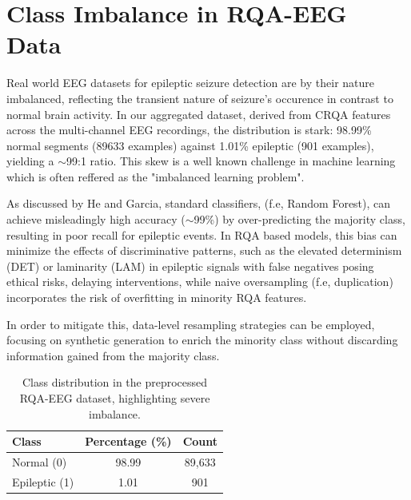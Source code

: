 \documentclass{article}
\begin{document}

				\section{Class Imbalance in RQA-EEG Data}

				Real world EEG datasets for epileptic seizure detection are by their nature imbalanced, 
				reflecting the transient nature of seizure's occurence in contrast to normal brain activity. 
				In our aggregated dataset, derived from CRQA features across the multi-channel EEG recordings,
				the distribution is stark: 98.99\% normal segments (89633 examples) against 1.01\% epileptic (901 examples), 
				yielding a $\sim$99:1 ratio. This skew is a well known challenge in machine 
				learning which is often reffered as the "imbalanced learning problem".

				As discussed by He and Garcia\cite{he2009}, standard classifiers, (f.e, Random Forest), 
				can achieve misleadingly high accuracy ($\sim$99\%) 
				by over-predicting the majority class, resulting in poor recall for epileptic events.
				In RQA based models, this bias can minimize the effects of discriminative patterns, 
				such as the elevated determinism (DET) or laminarity (LAM) in epileptic signals with 
				false negatives posing ethical risks, delaying interventions, while naive oversampling 
				(f.e, duplication) incorporates the risk of overfitting in minority RQA features.

				In order to mitigate this, data-level resampling strategies can be employed, focusing on 
				synthetic generation to enrich the minority class without discarding information gained from
				the majority class. 

				\begin{table}[h]
				\centering
				\caption{Class distribution in the preprocessed RQA-EEG dataset, highlighting severe imbalance.}
				\label{tab:imbalance}
				\begin{tabular}{lcc}
				\toprule
				Class & Percentage (\%) & Count \\
				\midrule
				Normal (0) & 98.99 & 89,633\\
				Epileptic (1) & 1.01 & 901 \\
				\bottomrule
				\end{tabular}
				\end{table}
				
\end{document}
